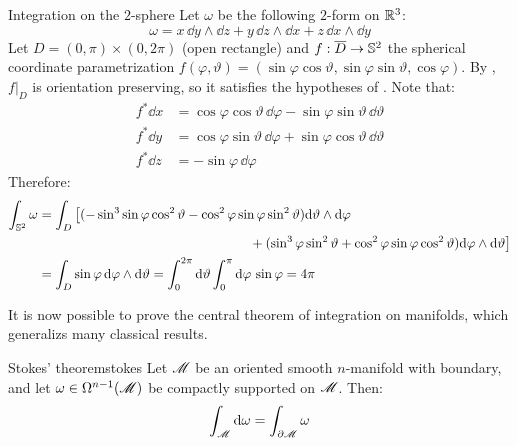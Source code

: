 \begin{example}{Integration on the $ 2 $-sphere}{}
  Let $ \omega $ be the following $ 2 $-form on $ \mathbb{R}^3 $:
  \begin{equation*}
    \omega = x \, \dd y \wedge \dd z + y \, \dd z \wedge \dd x + z \, \dd x \wedge \dd y
  \end{equation*}
  Let $ D = (0,\pi) \times (0,2\pi) $ (open rectangle) and $ f : \overline{D} \rightarrow \mathbb{S}^{2} $ the spherical coordinate parametrization $ f(\varphi , \vartheta) = (\sin \varphi \cos \vartheta , \sin \varphi \sin \vartheta , \cos \varphi) $. By , $ f \vert_D $ is orientation preserving, so it satisfies the hypotheses of . Note that:
  \begin{equation*}
    \begin{split}
      f^* \dd x & = \cos \varphi \cos \vartheta \, \dd \varphi - \sin \varphi \sin \vartheta \, \dd \vartheta \\
      f^* \dd y & = \cos \varphi \sin \vartheta \, \dd \varphi + \sin \varphi \cos \vartheta \, \dd \vartheta \\
      f^* \dd z & = - \sin \varphi \, \dd \varphi
    \end{split}
  \end{equation*}
  Therefore:
  \begin{equation*}
    \begin{split}
      \int_{\mathbb{S}^{2}} \omega
      & = \int_D \big[ (- \sin^3 \sin \varphi \cos^2 \vartheta - \cos^2 \varphi \sin \varphi \sin^2 \vartheta ) \mathrm{d} \vartheta \wedge \mathrm{d} \varphi \\
      & \qquad \qquad \qquad \qquad \qquad \qquad \qquad \qquad + (\sin^3 \varphi \sin^2 \vartheta + \cos^2 \varphi \sin \varphi \cos^2 \vartheta) \mathrm{d} \varphi \wedge \mathrm{d} \vartheta \big] \\
      & = \int_D \sin \varphi \, \mathrm{d} \varphi \wedge \mathrm{d} \vartheta = \int_0^{2\pi} \mathrm{d} \vartheta \int_0^\pi \mathrm{d} \varphi \, \sin \varphi = 4\pi
    \end{split}
  \end{equation*}
\end{example}

It is now possible to prove the central theorem of integration on manifolds, which generalizs many classical results.

\begin{theorem}{Stokes' theorem}{stokes}
  Let $ \mathscr{M} $ be an oriented smooth $ n $-manifold with boundary, and let $ \omega \in \Omega^{n-1}(\mathscr{M}) $ be compactly supported on $ \mathscr{M} $. Then:
  \begin{equation}
    \int_\mathscr{M} \mathrm{d} \omega = \int_{\partial \mathscr{M}} \omega
    \label{eq:stokes-th}
  \end{equation}
\end{theorem}

